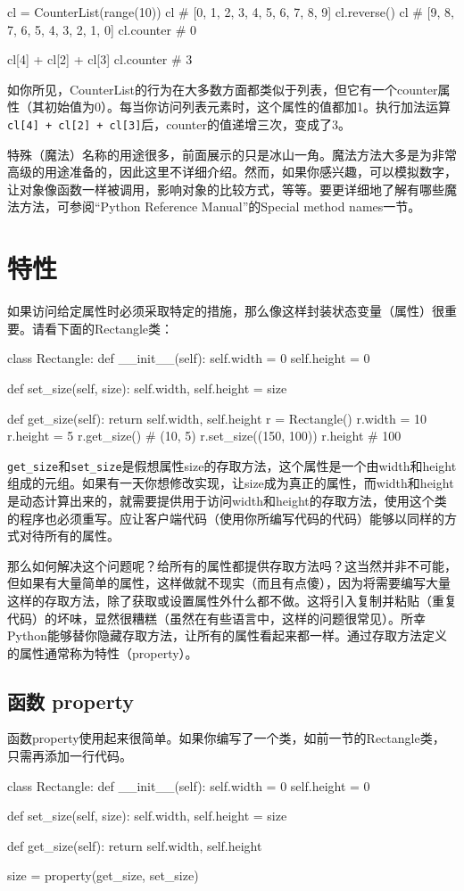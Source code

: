 \begin{pyc}
cl = CounterList(range(10))
cl  # [0, 1, 2, 3, 4, 5, 6, 7, 8, 9]
cl.reverse()
cl  # [9, 8, 7, 6, 5, 4, 3, 2, 1, 0]
cl.counter  # 0

cl[4] + cl[2] + cl[3]
cl.counter  # 3
\end{pyc}

如你所见，CounterList的行为在大多数方面都类似于列表，但它有一个counter属性（其初始值为0）。每当你访问列表元素时，这个属性的值都加1。执行加法运算\verb|cl[4] + cl[2] + cl[3]|后，counter的值递增三次，变成了3。

特殊（魔法）名称的用途很多，前面展示的只是冰山一角。魔法方法大多是为非常高级的用途准备的，因此这里不详细介绍。然而，如果你感兴趣，可以模拟数字，让对象像函数一样被调用，影响对象的比较方式，等等。要更详细地了解有哪些魔法方法，可参阅“Python Reference Manual”的Special method names一节。

\section{特性}
如果访问给定属性时必须采取特定的措施，那么像这样封装状态变量（属性）很重要。请看下面的Rectangle类：
\begin{pyc}
class Rectangle:
    def __init__(self):
        self.width = 0
        self.height = 0

    def set_size(self, size):
        self.width, self.height = size

    def get_size(self):
        return self.width, self.height
r = Rectangle()
r.width = 10
r.height = 5
r.get_size()  # (10, 5)
r.set_size((150, 100))
r.height  # 100
\end{pyc}
\verb|get_size|和\verb|set_size|是假想属性size的存取方法，这个属性是一个由width和height组成的元组。如果有一天你想修改实现，让size成为真正的属性，而width和height是动态计算出来的，就需要提供用于访问width和height的存取方法，使用这个类的程序也必须重写。应让客户端代码（使用你所编写代码的代码）能够以同样的方式对待所有的属性。

那么如何解决这个问题呢？给所有的属性都提供存取方法吗？这当然并非不可能，但如果有大量简单的属性，这样做就不现实（而且有点傻），因为将需要编写大量这样的存取方法，除了获取或设置属性外什么都不做。这将引入复制并粘贴（重复代码）的坏味，显然很糟糕（虽然在有些语言中，这样的问题很常见）。所幸Python能够替你隐藏存取方法，让所有的属性看起来都一样。通过存取方法定义的属性通常称为特性（property）。

\subsection{函数 property}
函数property使用起来很简单。如果你编写了一个类，如前一节的Rectangle类，只需再添加一行代码。
\begin{pyc}
class Rectangle:
    def __init__(self):
        self.width = 0
        self.height = 0

    def set_size(self, size):
        self.width, self.height = size

    def get_size(self):
        return self.width, self.height

    size = property(get_size, set_size)
\end{pyc}

